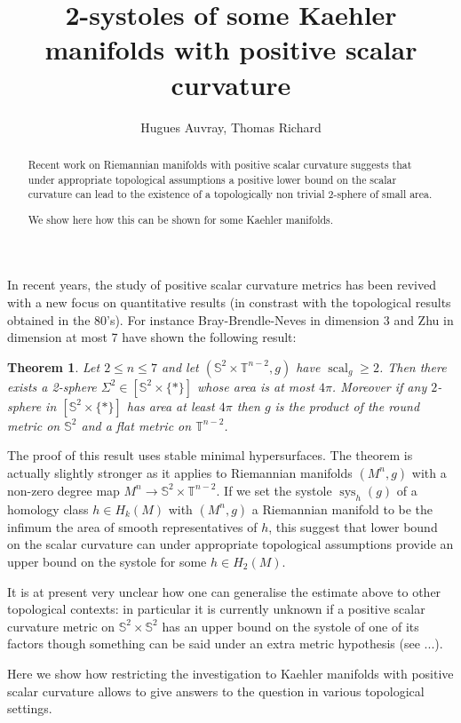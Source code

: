 \documentclass{amsart}
\title{2-systoles of some Kaehler manifolds with positive scalar curvature}
\author{Hugues Auvray, Thomas Richard}
\date{}
\newtheorem{theorem}{Theorem}[section]
\numberwithin{equation}{section}
\theoremstyle {definition}
\DeclareMathOperator{\scal}{scal}
\DeclareMathOperator{\sys}{sys}
\begin{document}
\maketitle
\begin{abstract}
    Recent work on Riemannian manifolds with positive scalar curvature suggests that under appropriate topological assumptions a positive lower bound on the scalar curvature can lead to the existence of a topologically non trivial 2-sphere of small area.

    We show here how this can be shown for some Kaehler manifolds.
\end{abstract}

In recent years, the study of positive scalar curvature metrics has been revived with a new focus on quantitative results (in constrast with the topological results obtained in the 80's). For instance Bray-Brendle-Neves in dimension 3 and Zhu in dimension at most 7 have shown the following result:

\begin{theorem}
    Let $2\leq n\leq 7$ and let $(\mathbb{S}^2\times\mathbb{T}^{n-2},g)$ have $\scal_g\geq 2$. Then there exists a 2-sphere $\Sigma^2\in [\mathbb{S}^2\times\{\ast\}]$ whose area is at most $4\pi$. Moreover if any $2$-sphere in $[\mathbb{S}^2\times\{\ast\}]$ has area at least $4\pi$ then $g$ is the product of the round metric on $\mathbb{S}^2$ and a flat metric on $\mathbb{T}^{n-2}$.
\end{theorem}

The proof of this result uses stable minimal hypersurfaces. The theorem is actually slightly stronger as it applies to Riemannian manifolds $(M^n,g)$ with a non-zero degree map $M^n\to \mathbb{S}^2\times\mathbb{T}^{n-2}$. If we set the systole $\sys_h(g)$ of a homology class $h\in H_k(M)$ with $(M^n,g)$ a Riemannian manifold to be the infimum the area of smooth representatives of $h$, this suggest that lower bound on the scalar curvature can under appropriate topological assumptions provide an upper bound on the systole for some $h\in H_2(M)$.

It is at present very unclear how one can generalise the estimate above to other topological contexts: in particular it is currently unknown if a positive scalar curvature metric on $\mathbb{S}^2\times\mathbb{S}^2$ has an upper bound on the systole of one of its factors though something can be said under an extra metric hypothesis (see ...).

Here we show how restricting the investigation to Kaehler manifolds with positive scalar curvature allows to give answers to the question in various topological settings.
\end{document}
